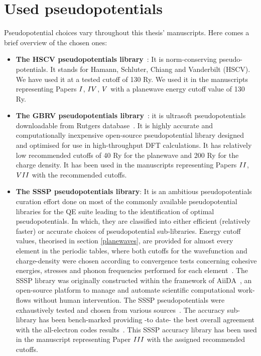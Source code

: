 \section{Used pseudopotentials}
Pseudopotential choices vary throughout this thesis' manuscripts. Here comes a brief overview of the chosen ones: 
\begin{itemize}
    \item \textbf{The HSCV pseudopotentials library}~\cite{PP_HSCV}: It is norm-conserving pseudo-potentials. It stands for Hamann, Schluter, Chiang and Vanderbilt (HSCV). We have used it at a tested cutoff of 130 Ry. We used it in the manuscripts representing Papers \hyperref[P1]{$\Rmnum{1}$}, \hyperref[P4]{$\Rmnum{4}$}, \hyperref[P5]{$\Rmnum{5}$} with a planewave energy cutoff value of 130 Ry.
\item \textbf{The GBRV pseudopotentials library}~\cite{Garrity2014}: it is ultrasoft pseudopotentials downloadable from Rutgers database~\cite{GBRVdatabase}. It is highly accurate and computationally inexpensive open-source pseudopotential library designed and optimised for use in high-throughput DFT calculations. It has relatively low recommended cutoffs of 40 Ry for the planewave and 200 Ry for the charge density. It has been used in the manuscripts representing Papers \hyperref[P2]{$\Rmnum{2}$}, \hyperref[P7]{$\Rmnum{7}$} with the recommended cutoffs.
\item \textbf{The SSSP pseudopotentials library}\cite{SSSP}: It is an ambitious pseudopotentials curation effort done on most of the commonly available pseudopotential libraries for the QE suite leading to the identification of optimal pseudopotentials. In which, they are classified into either efficient (relatively faster) or accurate choices of pseudopotential sub-libraries. Energy cutoff values, theorised in section \ref{planewaves}, are provided for almost every element in the periodic tables, where both cutoffs for the wavefunction and charge-density were chosen according to convergence tests concerning cohesive energies, stresses and phonon frequencies performed for each element~\cite{SSSP}. The SSSP library was originally constructed within the framework of AiiDA~\cite{Pizzi2016, AiiDA_link}, an open-source platform to manage and automate scientific computational work-flows without human intervention. The SSSP pseudopotentials were exhaustively tested and chosen from various sources~\cite{Garrity2014, Kucukbenli2014, Dalcorso2014, Schlipf2015, Willand2013, Topsakal2014}. The accuracy sub-library has been bench-marked providing -to date- the best overall agreement with the all-electron codes results~\cite{Lejaeghere2014, Lejaeghere2016}. This SSSP accuracy library has been used in the manuscript representing Paper \hyperref[P3]{$\Rmnum{3}$} with the assigned recommended cutoffs.

\end{itemize}
